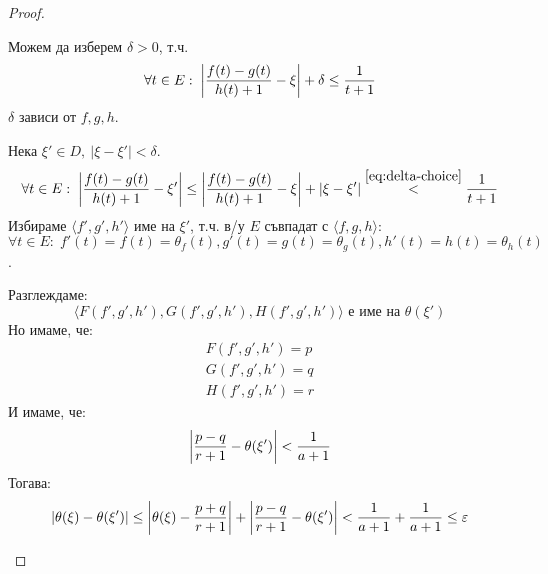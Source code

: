 \begin{proof}
\begin{itemize}
        Можем да изберем $\delta > 0$, т.ч.
        \begin{equation}\label{eq:delta-choice}
            \forall t \in E:\; \left|\frac{f(t) - g(t)}{h(t) + 1} - \xi\right| + \delta \leq \frac{1}{t+1}
        \end{equation}
        $\delta$ зависи от $f, g, h$.

        Нека $\xi' \in D,\ |\xi - \xi'| < \delta$.
        \begin{equation}
            \forall t \in E:\; \left|\frac{f(t) - g(t)}{h(t) + 1} - \xi'\right| \leq \left|\frac{f(t) - g(t)}{h(t) + 1} - \xi\right| + \left|\xi - \xi'\right| \overset{\eqref{eq:delta-choice}}{<} \frac{1}{t+1}
        \end{equation}
        Избираме $\langle f', g', h' \rangle$ име на $\xi'$, т.ч. в/у $E$ съвпадат с $\langle f, g, h \rangle$: $\forall t \in E:\; f'(t) = f(t) = \theta_f(t), g'(t) = g(t) = \theta_g(t), h'(t) = h(t) = \theta_h(t)$.

        Разглеждаме:
        \begin{equation}
            \langle F(f', g', h'), G(f', g', h'), H(f', g', h') \rangle \text{ е име на } \theta(\xi')
        \end{equation}
        Но имаме, че:
        \begin{equation}
            \begin{split}
                F(f',g',h') = p \\
                G(f',g',h') = q \\
                H(f',g',h') = r
            \end{split}
        \end{equation}
        И имаме, че:
        \begin{equation}
            \left|\frac{p-q}{r+1} - \theta(\xi')\right| < \frac{1}{a+1}
        \end{equation}
        Тогава:
        \begin{equation}
            \left|\theta(\xi) - \theta(\xi')\right| \leq \left|\theta(\xi) - \frac{p+q}{r+1}\right| + \left|\frac{p-q}{r+1} - \theta(\xi')\right| < \frac{1}{a+1} + \frac{1}{a+1} \leq \varepsilon
        \end{equation}
    \end{itemize}
\end{proof}

